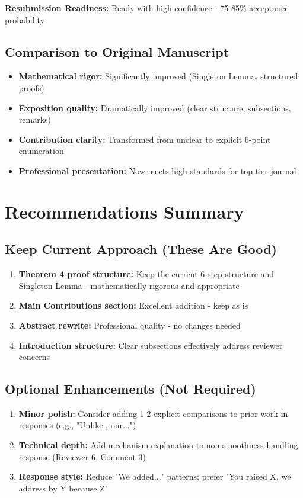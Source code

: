 \documentclass[11pt]{article}
\begin{document}
\textbf{Resubmission Readiness:} \textcolor{success}{Ready with high confidence - 75-85\% acceptance probability}

\subsection{Comparison to Original Manuscript}

\begin{itemize}
\item \textbf{Mathematical rigor:} Significantly improved (Singleton Lemma, structured proofs)
\item \textbf{Exposition quality:} Dramatically improved (clear structure, subsections, remarks)
\item \textbf{Contribution clarity:} Transformed from unclear to explicit 6-point enumeration
\item \textbf{Professional presentation:} Now meets high standards for top-tier journal
\end{itemize}

\section{Recommendations Summary}

\subsection{Keep Current Approach (These Are Good)}

\begin{enumerate}
\item \textbf{Theorem 4 proof structure:} Keep the current 6-step structure and Singleton Lemma - mathematically rigorous and appropriate
\item \textbf{Main Contributions section:} Excellent addition - keep as is
\item \textbf{Abstract rewrite:} Professional quality - no changes needed
\item \textbf{Introduction structure:} Clear subsections effectively address reviewer concerns
\end{enumerate}

\subsection{Optional Enhancements (Not Required)}

\begin{enumerate}
\item \textbf{Minor polish:} Consider adding 1-2 explicit comparisons to prior work in responses (e.g., "Unlike \cite{bental2009}, our...")
\item \textbf{Technical depth:} Add mechanism explanation to non-smoothness handling response (Reviewer 6, Comment 3)
\item \textbf{Response style:} Reduce "We added..." patterns; prefer "You raised X, we address by Y because Z"
\end{enumerate}
\end{document}
